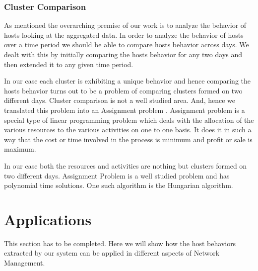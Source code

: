 \subsubsection*{Cluster Comparison}
As mentioned the overarching premise of our work is to analyze the behavior of hosts looking at the aggregated data. In order to analyze the behavior of hosts over a time period we should be able to compare hosts behavior across days. We dealt with this by initially comparing the hosts behavior for any two days and then extended it to any given time period.

In our case each cluster is exhibiting a unique behavior and hence comparing the hosts behavior turns out to be a problem of comparing clusters formed on two different days. Cluster comparison is not a well studied area. And, hence we translated this problem into an Assignment problem \cite{kuhn1955hungarian}. Assignment problem is a special type of linear programming problem which deals with the allocation of the various resources to the various activities on one to one basis. It does it in such a way that the cost or time involved in the process is minimum and profit or sale is maximum. 

In our case both the resources and activities are nothing but clusters formed on two different days. Assignment Problem is a well studied problem and has polynomial time solutions. One such algorithm is the Hungarian algorithm. 

\section{Applications}
This section has to be completed. Here we will show how the host behaviors extracted
by our system can be applied in different aspects of Network Management.